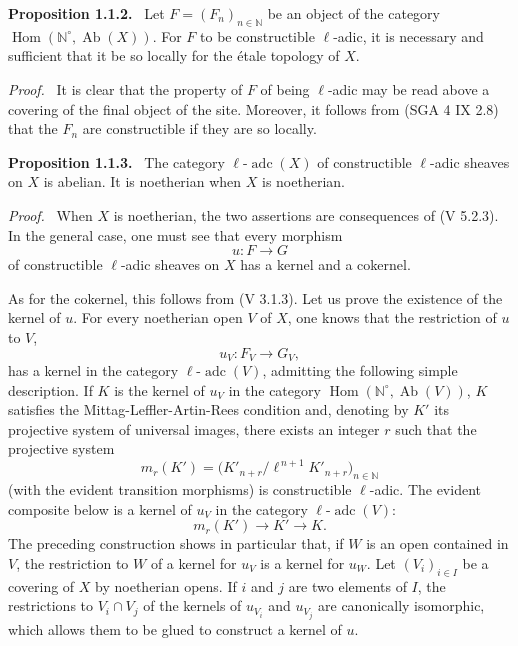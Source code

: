 \documentclass[11pt]{article}
\newenvironment{statement}[1]{\par\medskip\noindent\textbf{#1.}\ }{\par\medskip}
\newenvironment{prooftext}[1][Proof]{\par\noindent\emph{#1.}\ }{\par\medskip}
\DeclareMathOperator{\Hom}{Hom}
\providecommand{\Hom}{\operatorname{Hom}}
\providecommand{\Ab}{\operatorname{Ab}}
\providecommand{\adc}{\operatorname{adc}}
\providecommand{\Ab}{\operatorname{Ab}}
\begin{document}
\begin{statement}{Proposition 1.1.2}
Let \(F=(F_n)_{n\in\mathbb N}\) be an object of the category \(\Hom(\mathbb N^\circ,\Ab(X))\). For \(F\) to be constructible \(\ell\)-adic, it is necessary and sufficient that it be so locally for the étale topology of \(X\).
\end{statement}

\begin{prooftext}[Proof]
It is clear that the property of \(F\) of being \(\ell\)-adic may be read above a covering of the final object of the site. Moreover, it follows from (SGA 4 IX 2.8) that the \(F_n\) are constructible if they are so locally.
\end{prooftext}

\begin{statement}{Proposition 1.1.3}
The category \(\ell\text{-}\adc(X)\) of constructible \(\ell\)-adic sheaves on \(X\) is abelian. It is noetherian when \(X\) is noetherian.
\end{statement}

\begin{prooftext}[Proof]
When \(X\) is noetherian, the two assertions are consequences of (V 5.2.3). In the general case, one must see that every morphism
\[
u:F\longrightarrow G
\]
of constructible \(\ell\)-adic sheaves on \(X\) has a kernel and a cokernel.

As for the cokernel, this follows from (V 3.1.3). Let us prove the existence of the kernel of \(u\). For every noetherian open \(V\) of \(X\), one knows that the restriction of \(u\) to \(V\),
\[
u_V:F_V\longrightarrow G_V,
\]
has a kernel in the category \(\ell\text{-}\adc(V)\), admitting the following simple description. If \(K\) is the kernel of \(u_V\) in the category \(\Hom(\mathbb N^\circ,\Ab(V))\), \(K\) satisfies the Mittag-Leffler-Artin-Rees condition and, denoting by \(K'\) its projective system of universal images, there exists an integer \(r\) such that the projective system
\[
m_r(K')=\bigl(K'_{n+r}/\ell^{\,n+1}K'_{n+r}\bigr)_{n\in\mathbb N}
\]
(with the evident transition morphisms) is constructible \(\ell\)-adic. The evident composite below is a kernel of \(u_V\) in the category \(\ell\text{-}\adc(V)\):
\[
m_r(K')\longrightarrow K'\longrightarrow K.
\]
The preceding construction shows in particular that, if \(W\) is an open contained in \(V\), the restriction to \(W\) of a kernel for \(u_V\) is a kernel for \(u_W\). Let \((V_i)_{i\in I}\) be a covering of \(X\) by noetherian opens. If \(i\) and \(j\) are two elements of \(I\), the restrictions to \(V_i\cap V_j\) of the kernels of \(u_{V_i}\) and \(u_{V_j}\) are canonically isomorphic, which allows them to be glued to construct a kernel of \(u\).
\end{prooftext}
\end{document}
